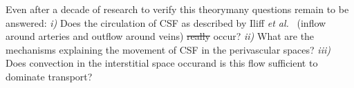 \documentclass[a4paper,11pt]{article} %
\newcommand{\etal}{\emph{et al.}\;}
\newcommand{\1}{^{(1)}}
\newcommand{\2}{^{(2)}}
\providecommand{\DIFaddtex}[1]{{\protect\color{blue}\uwave{#1}}} %
\providecommand{\DIFdeltex}[1]{{\protect\color{red}\sout{#1}}}                      %
\providecommand{\DIFaddbegin}{} %
\providecommand{\DIFaddend}{} %
\providecommand{\DIFdelbegin}{} %
\providecommand{\DIFdelend}{} %
\providecommand{\DIFadd}[1]{\texorpdfstring{\DIFaddtex{#1}}{#1}} %
\providecommand{\DIFdel}[1]{\texorpdfstring{\DIFdeltex{#1}}{}} %
\newcommand{\DIFscaledelfig}{0.5}
\newlength{\DIFdelgraphicswidth} %
\newlength{\DIFdelgraphicsheight} %
\newcommand{\DIFaddincludegraphics}[2][]{{\color{blue}\fbox{\DIFOincludegraphics[#1]{#2}}}} %
\newcommand{\DIFdelincludegraphics}[2][]{%
\sbox{\DIFdelgraphicsbox}{\DIFOincludegraphics[#1]{#2}}%
\settoboxwidth{\DIFdelgraphicswidth}{\DIFdelgraphicsbox} %
\settoboxtotalheight{\DIFdelgraphicsheight}{\DIFdelgraphicsbox} %
\scalebox{\DIFscaledelfig}{%
\parbox[b]{\DIFdelgraphicswidth}{\usebox{\DIFdelgraphicsbox}\\[-\baselineskip] \rule{\DIFdelgraphicswidth}{0em}}\llap{\resizebox{\DIFdelgraphicswidth}{\DIFdelgraphicsheight}{%
\setlength{\unitlength}{\DIFdelgraphicswidth}%
\begin{picture}(1,1)%
\thicklines\linethickness{2pt} %
{\color[rgb]{1,0,0}\put(0,0){\framebox(1,1){}}}%
{\color[rgb]{1,0,0}\put(0,0){\line( 1,1){1}}}%
{\color[rgb]{1,0,0}\put(0,1){\line(1,-1){1}}}%
\end{picture}%
}\hspace*{3pt}}} %
} %
\DeclareRobustCommand{\DIFaddbegin}{\DIFOaddbegin \let\includegraphics\DIFaddincludegraphics} %
\DeclareRobustCommand{\DIFaddend}{\DIFOaddend \let\includegraphics\DIFOincludegraphics} %
\DeclareRobustCommand{\DIFdelbegin}{\DIFOdelbegin \let\includegraphics\DIFdelincludegraphics} %
\DeclareRobustCommand{\DIFdelend}{\DIFOaddend \let\includegraphics\DIFOincludegraphics} %
\begin{document}
Even after a decade of research to verify this theory\DIFaddbegin \DIFadd{, }\DIFaddend many questions remain to be answered:
\textit{i)} Does the circulation of CSF as described by Iliff \etal~\cite{Iliff_2012_PVS} (inflow around arteries and outflow around veins) \DIFdelbegin \DIFdel{really }\DIFdelend occur? 
\textit{ii)} What are the mechanisms explaining the movement of CSF in the perivascular spaces?
\textit{iii)} Does convection in the interstitial space occur\DIFaddbegin \DIFadd{, }\DIFaddend and is this flow sufficient to dominate transport? 

\DIFdelbegin %
\end{document}
